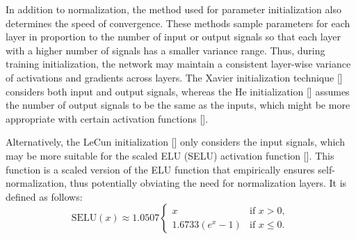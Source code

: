 In addition to normalization, the method used for parameter initialization also determines the speed of convergence. These methods sample parameters for each layer in proportion to the number of input or output signals so that each layer with a higher number of signals has a smaller variance range. Thus, during training initialization, the network may maintain a consistent layer-wise variance of activations and gradients across layers. The Xavier initialization technique [\cite{glorot2010}] considers both input and output signals, whereas the He initialization [\cite{he2015}] assumes the number of output signals to be the same as the inputs, which might be more appropriate with certain activation functions [\cite{mlbook}].

Alternatively, the LeCun initialization [\cite{lecun2012}] only considers the input signals, which may be more suitable for the scaled ELU (SELU) activation function [\cite{klambauer2017, mlbook}]. This function is a scaled version of the ELU function that empirically ensures self-normalization, thus potentially obviating the need for normalization layers. It is defined as follows:
%
\begin{equation}
 \text{SELU}(x) \approx 1.0507 \begin{cases} 
x & \text{if } x > 0, \\
1.6733 ( e^x - 1) & \text{if } x \leq 0 .
\end{cases}
\end{equation}

